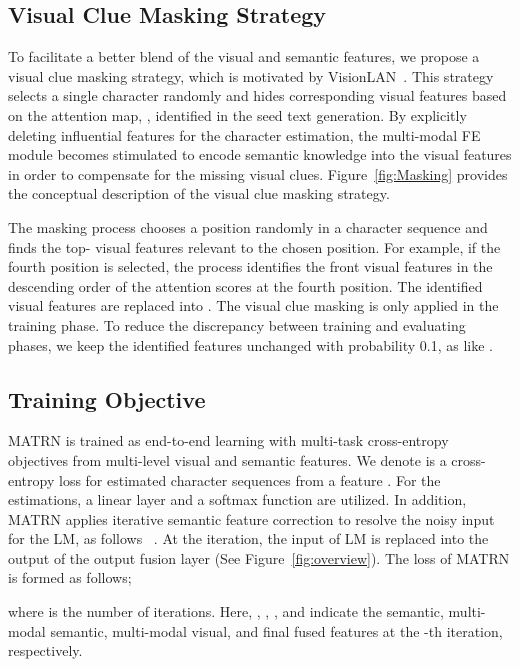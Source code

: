 \documentclass[runningheads]{llncs}
\begin{document}
\subsection{Visual Clue Masking Strategy}

To facilitate a better blend of the visual and semantic features, we propose a visual clue masking strategy, which is motivated by VisionLAN~\cite{VisionLAN}. This strategy selects a single character randomly and hides corresponding visual features based on the attention map, , identified in the seed text generation.
By explicitly deleting influential features for the character estimation, the multi-modal FE module becomes stimulated to encode semantic knowledge into the visual features in order to compensate for the missing visual clues. Figure~\ref{fig:Masking} provides the conceptual description of the visual clue masking strategy.

The masking process chooses a position randomly in a character sequence and finds the top- visual features relevant to the chosen position. For example, if the fourth position is selected, the process identifies the front  visual features in the descending order of the attention scores at the fourth position. The identified visual features are replaced into . The visual clue masking is only applied in the training phase. To reduce the discrepancy between training and evaluating phases, we keep the identified features unchanged with probability 0.1, as like \cite{devlin-etal-2019-bert}.

\subsection{Training Objective}

MATRN is trained as end-to-end learning with multi-task cross-entropy objectives from multi-level visual and semantic features. We denote  is a cross-entropy loss for estimated character sequences from a feature . For the estimations, a linear layer and a softmax function are utilized.
In addition, MATRN applies iterative semantic feature correction to resolve the noisy input for the LM, as follows ~\cite{ABINet,lee_etal_2018_deterministic}. At the iteration, the input of LM is replaced into the output of the output fusion layer (See Figure~\ref{fig:overview}). The loss of MATRN is formed as follows;

where  is the number of iterations. Here, , , , and  indicate the semantic, multi-modal semantic, multi-modal visual, and final fused features at the -th iteration, respectively.   
\end{document}
